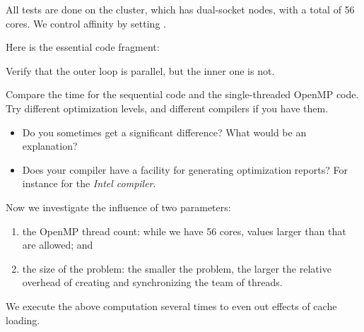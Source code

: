 All tests are done on the  cluster,
which has dual-socket  nodes,
with a total of 56 cores.
We control affinity by setting
.

Here is the essential code fragment:

\begin{exercise}
  Verify that the outer loop is parallel, but the inner one is not.
\end{exercise}

\begin{exercise}
  Compare the time for the sequential code and the single-threaded OpenMP code.
  Try different optimization levels, and different compilers if you have them.
  \begin{itemize}
  \item
    Do you sometimes get a significant difference? What would be an explanation?
  \item Does your compiler have a facility for generating optimization reports?
    For instance  for the
    \emph{Intel compiler}.
  \end{itemize}
\end{exercise}

Now we investigate the influence of two parameters:
\begin{enumerate}
\item the OpenMP thread count: while we have 56 cores, values larger than that are allowed; and
\item the size of the problem: the smaller the problem, the larger the relative overhead
  of creating and synchronizing the team of threads.
\end{enumerate}
We execute the above computation several times to even out effects of cache loading.

